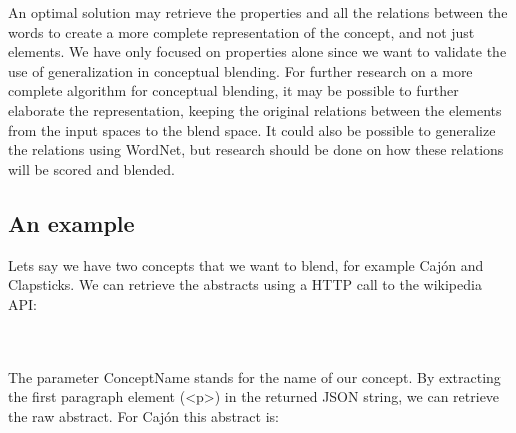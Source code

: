 An optimal solution may retrieve the properties and all the relations between the words to create a more complete representation of the concept, and not just elements. We have only focused on properties alone since we want to validate the use of generalization in conceptual blending. For further research on a more complete algorithm for conceptual blending, it may be possible to further elaborate the representation, keeping the original relations between the elements from the input spaces to the blend space. It could also be possible to generalize the relations using WordNet, but research should be done on how these relations will be scored and blended.

\subsection{An example}

Lets say we have two concepts that we want to blend, for example Cajón and Clapsticks.
We can retrieve the abstracts using a HTTP call to the wikipedia API:

\noindent{}
\\\\The parameter ConceptName stands for the name of our concept. By extracting the first paragraph element (<p>) in the returned JSON string, we can retrieve the raw abstract. For Cajón this abstract is:
 
